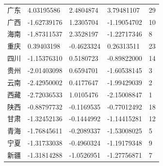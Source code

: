 \documentclass[UTF8,a4paper]{ctexart}
\begin{document}
\begin{tabular}{r|llll}
	广东 &  4.03195586 &  2.4804874 &  3.79481107 & 29\\
	广西 & -1.62739176 &  1.2305704 & -1.19054702 & 10\\
	海南 & -1.87311537 &  2.3528197 & -1.22717346 &  8\\
	重庆 &  0.39403198 & -0.4623324 &  0.26313511 & 23\\
	四川 & -1.15376310 &  0.5180723 & -0.89822000 & 14\\
	贵州 & -2.01403098 &  0.6594701 & -1.60538145 &  3\\
	云南 & -2.42950002 &  0.4177647 & -1.99429039 &  2\\
	西藏 & -2.72036533 &  1.0105476 & -2.15008847 &  1\\
	陕西 & -0.88797732 & -0.1169535 & -0.77012492 & 18\\
	甘肃 & -1.32452136 & -0.1444992 & -1.14415281 & 12\\
	青海 & -1.76845611 & -0.2089337 & -1.53008025 &  5\\
	宁夏 & -1.31733038 & -0.4960324 & -1.19179348 &  9\\
	新疆 & -1.31814288 & -1.0526951 & -1.27756871 &  7\\
\end{tabular}
\end{document}
